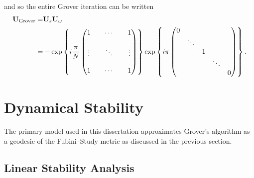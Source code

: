 and so the entire Grover iteration can be written
\begin{equation}
\begin{split}
{\bf U}_{\text{Grover}} =& {\bf U}_s {\bf U}_\omega\\ 
=& - \exp \left\lbrace  i\frac{\pi}{N}
                \begin{pmatrix}
                    1      &        & \cdots &      & 1 \\
                    \\
                    \vdots &        & \ddots &      & \vdots \\
                    \\
                    1      &        & \cdots &      & 1
                \end{pmatrix}
\right\rbrace
\exp \left\lbrace  i\pi
                \begin{pmatrix}
                    0       &        &        &        &  \\
                            & \ddots &        &        &  \\
                            &        & 1      &        &  \\
                            &        &        & \ddots &  \\
                            &        &        &        & 0
                \end{pmatrix}
\right\rbrace.
\end{split}
\end{equation}




\section{Dynamical Stability}
\label{sec:dynamicalStability}
%


The primary model used in this dissertation approximates 
Grover's algorithm as a geodesic of the Fubini--Study metric 
as discussed in the previous section.%

\subsection{Linear Stability Analysis}

